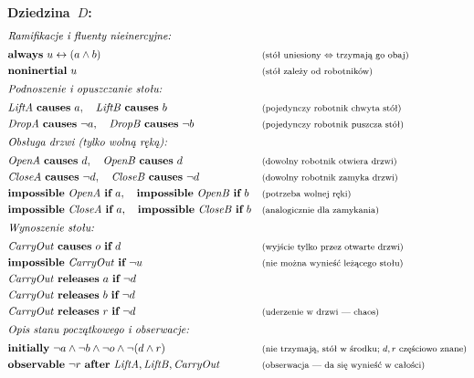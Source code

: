 \documentclass[11pt,a4paper]{article}
\newcommand{\causes}{\textbf{causes}}
\newcommand{\aft}{\textbf{after}}
\renewcommand{\iff}{\textbf{if}}
\newcommand{\initially}{\textbf{initially}}
\newcommand{\always}{\textbf{always}}
\newcommand{\impossible}{\textbf{impossible}}
\newcommand{\releases}{\textbf{releases}}
\newcommand{\noninertial}{\textbf{noninertial}}
\newcommand{\observable}{\textbf{observable}}
\newcommand{\cmt}[1]{\text{\footnotesize\normalfont (#1)}}
\theoremstyle{definition}
\begin{document}
\medskip
\noindent\textbf{Dziedzina~$D$:}
{\small
\begin{align*}
  \shortintertext{\textit{Ramifikacje i~fluenty nieinercyjne:}}
  &\always\ u \leftrightarrow (a \land b)
    && \cmt{stół uniesiony $\Leftrightarrow$ trzymają go obaj} \\
  &\noninertial\ u
    && \cmt{stół zależy od~robotników} \\
  \shortintertext{\textit{Podnoszenie i~opuszczanie stołu:}}
  &\mathit{LiftA}\ \causes\ a,
   \quad \mathit{LiftB}\ \causes\ b
    && \cmt{pojedynczy robotnik chwyta stół} \\
  &\mathit{DropA}\ \causes\ \neg a,
   \quad \mathit{DropB}\ \causes\ \neg b
    && \cmt{pojedynczy robotnik puszcza stół} \\
  \shortintertext{\textit{Obsługa drzwi (tylko wolną ręką):}}
  &\mathit{OpenA}\ \causes\ d,
   \quad \mathit{OpenB}\ \causes\ d
    && \cmt{dowolny robotnik otwiera drzwi} \\
  &\mathit{CloseA}\ \causes\ \neg d,
   \quad \mathit{CloseB}\ \causes\ \neg d
    && \cmt{dowolny robotnik zamyka drzwi} \\
  &\impossible\ \mathit{OpenA}\ \iff\ a,
   \quad \impossible\ \mathit{OpenB}\ \iff\ b
    && \cmt{potrzeba wolnej ręki} \\
  &\impossible\ \mathit{CloseA}\ \iff\ a,
   \quad \impossible\ \mathit{CloseB}\ \iff\ b
    && \cmt{analogicznie dla zamykania} \\
  \shortintertext{\textit{Wynoszenie stołu:}}
  &\mathit{CarryOut}\ \causes\ o\ \iff\ d
    && \cmt{wyjście tylko przez otwarte drzwi} \\
  &\impossible\ \mathit{CarryOut}\ \iff\ \neg u
    && \cmt{nie można wynieść leżącego stołu} \\
  &\mathit{CarryOut}\ \releases\ a\ \iff\ \neg d \\
  &\mathit{CarryOut}\ \releases\ b\ \iff\ \neg d \\
  &\mathit{CarryOut}\ \releases\ r\ \iff\ \neg d
    && \cmt{uderzenie w~drzwi --- chaos} \\
  \shortintertext{\textit{Opis stanu początkowego i~obserwacje:}}
  &\initially\ \neg a \land \neg b \land \neg o \land \neg(d \land r)
    && \cmt{nie trzymają, stół w~środku; $d,r$ częściowo znane} \\
  &\observable\ \neg r\ \aft\ \mathit{LiftA}, \mathit{LiftB}, \mathit{CarryOut}
    && \cmt{obserwacja --- da się wynieść w~całości}
\end{align*}
}
\end{document}
